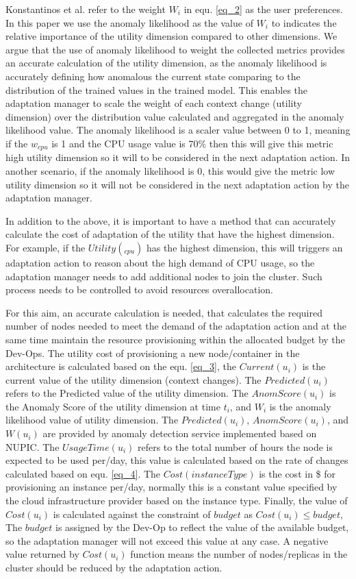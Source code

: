 \documentclass[sigconf]{acmart}
\begin{document}
Konstantinos et al. \cite{KonstantinosKakousis:2008ub} refer to the weight $W_{i}$ in equ. \ref{eq_2} as the user preferences. In this paper we use the anomaly likelihood as the value of $W_{i}$ to indicates the relative importance of the utility dimension compared to other dimensions. We argue that the use of anomaly likelihood to weight the collected metrics provides an accurate calculation of the utility dimension, as the anomaly likelihood is accurately defining how anomalous the current state comparing to the distribution of the trained values in the trained model. This enables the adaptation manager to scale the weight of each context change (utility dimension) over the distribution value calculated and aggregated in the anomaly likelihood value. The anomaly likelihood is a scaler value between 0 to 1, meaning if the $w_{cpu}$ is 1 and the CPU usage value is 70\% then this will give this metric high utility dimension so it will to be considered in the next adaptation action. In another scenario, if the anomaly likelihood is 0, this would give the metric low utility dimension so it will not be considered in the next adaptation action by the adaptation manager. 


In addition to the above, it is important to have a method that can accurately calculate the cost of adaptation of the utility that have the highest dimension. For example, if the $Utility(_{cpu})$ has the highest dimension, this will triggers an adaptation action to reason about the high demand of CPU usage, so the adaptation manager needs to add additional nodes to join the cluster. Such process needs to be controlled to avoid resources overallocation. 

For this aim, an accurate calculation is needed, that calculates the required number of nodes needed to meet the demand of the adaptation action and at the same time maintain the resource provisioning within the allocated budget by the Dev-Ops. The utility cost of provisioning a new node/container in the architecture is calculated based on the equ. \ref{eq_3}, the $Current(u_{i})$ is the current value of the utility dimension (context changes). The $Predicted(u_{i})$ refers to the Predicted value of the utility dimension. The $AnomScore(u_{i})$ is the Anomaly Score of the utility dimension at time $t_{i}$, and $W_{i}$ is the anomaly likelihood value of utility dimension. The $Predicted(u_{i})$, $AnomScore(u_{i})$, and $W(u_{i})$ are provided by anomaly detection service implemented based on NUPIC.  The $UsageTime(u_{i})$ refers to the total number of hours the node is expected to be used per/day, this value is calculated based on the rate of changes calculated based on equ. \ref{eq_4}. The $Cost(instanceType)$ is the cost in \$ for provisioning an instance per/day, normally this is a constant value specified by the cloud infrastructure provider based on the instance type. Finally, the value of $Cost(u_{i})$ is calculated against the constraint of $budget$ as $ Cost(u_{i})  \leq  budget $, The $budget$ is assigned by the Dev-Op to reflect the value of the available budget, so the adaptation manager will not exceed this value at any case. A negative value returned by $Cost(u_{i})$ function means the number of nodes/replicas in the cluster should be reduced by the adaptation action. 
\end{document}
